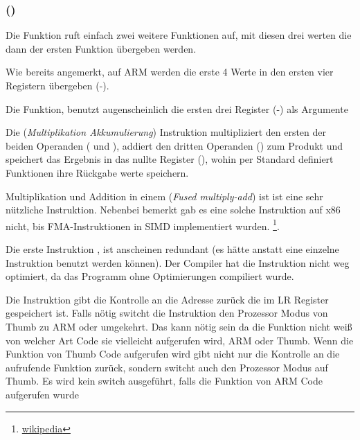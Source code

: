 \subsubsection{\NonOptimizingKeilVI (\ARMMode)}



Die \main Funktion ruft einfach zwei weitere Funktionen auf, mit diesen drei werten die dann
der ersten Funktion übergeben werden.

Wie bereits angemerkt, auf ARM werden die erste 4 Werte in den ersten vier Registern übergeben (-).

Die \ttf Funktion, benutzt augenscheinlich die ersten drei Register (-) als Argumente


Die  (\emph{Multiplikation Akkumulierung})
Instruktion multipliziert den ersten der beiden Operanden ( und ), addiert den dritten Operanden
() zum Produkt und speichert das Ergebnis in das nullte Register (), wohin per Standard definiert
Funktionen ihre Rückgabe werte speichern.

Multiplikation und Addition in einem (\emph{Fused multiply-add})
ist ist eine sehr nützliche Instruktion. Nebenbei bemerkt gab es eine solche Instruktion 
auf x86 nicht, bis FMA-Instruktionen in SIMD implementiert wurden.
\footnote{\href{https://en.wikipedia.org/wiki/FMA_instruction_set}{wikipedia}}.

Die erste Instruktion ,
ist anscheinen redundant (es hätte anstatt eine einzelne  Instruktion benutzt werden können).
Der Compiler hat die Instruktion nicht weg optimiert, da das Programm ohne Optimierungen compiliert wurde.


Die  Instruktion gibt die Kontrolle an die Adresse zurück die im \ac{LR} Register gespeichert ist.
Falls nötig switcht die Instruktion den Prozessor Modus von Thumb zu ARM oder umgekehrt.
Das kann nötig sein da die \ttf Funktion nicht weiß von welcher Art Code sie vielleicht aufgerufen wird,
ARM oder Thumb.
Wenn die Funktion von Thumb Code aufgerufen wird gibt  nicht nur 
die Kontrolle an die aufrufende Funktion zurück, sondern switcht auch den Prozessor Modus auf 
Thumb. Es wird kein switch ausgeführt, falls die Funktion von ARM Code aufgerufen wurde  
